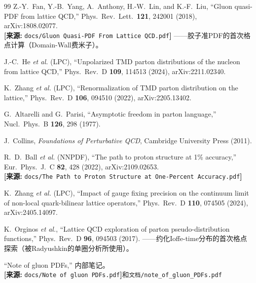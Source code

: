 \documentclass[12pt,a4paper]{ctexart}
\theoremstyle{definition}
\begin{document}
\begin{thebibliography}{99}
Z.-Y.~Fan, Y.-B.~Yang, A.~Anthony, H.-W.~Lin, and K.-F.~Liu,
``Gluon quasi-PDF from lattice QCD,''
Phys.\ Rev.\ Lett.\ \textbf{121}, 242001 (2018), arXiv:1808.02077.
\\\textbf{[来源:} \texttt{docs/Gluon Quasi-PDF From Lattice QCD.pdf}\textbf{]}
——胶子准PDF的首次格点计算（Domain-Wall费米子）。

J.-C.~He \textit{et al.} (LPC), ``Unpolarized TMD parton distributions of the nucleon from lattice QCD,''
Phys.\ Rev.\ D \textbf{109}, 114513 (2024), arXiv:2211.02340.

K.~Zhang \textit{et al.} (LPC), ``Renormalization of TMD parton distribution on the lattice,''
Phys.\ Rev.\ D \textbf{106}, 094510 (2022), arXiv:2205.13402.

G.~Altarelli and G.~Parisi, ``Asymptotic freedom in parton language,''
Nucl.\ Phys.\ B \textbf{126}, 298 (1977).

J.~Collins, \textit{Foundations of Perturbative QCD}, Cambridge University Press (2011).

R.~D.~Ball \textit{et al.} (NNPDF), ``The path to proton structure at 1\% accuracy,''
Eur.\ Phys.\ J.\ C \textbf{82}, 428 (2022), arXiv:2109.02653.
\\\textbf{[来源:} \texttt{docs/The Path to Proton Structure at One-Percent Accuracy.pdf}\textbf{]}

K.~Zhang \textit{et al.} (LPC), ``Impact of gauge fixing precision on the continuum limit of non-local quark-bilinear lattice operators,''
Phys.\ Rev.\ D \textbf{110}, 074505 (2024), arXiv:2405.14097.

K.~Orginos \textit{et al.}, ``Lattice QCD exploration of parton pseudo-distribution functions,''
Phys.\ Rev.\ D \textbf{96}, 094503 (2017).
——约化Ioffe-time分布的首次格点探索（被Radyushkin的单圈分析所使用）。

``Note of gluon PDFs,'' 内部笔记。
\\\textbf{[来源:} \texttt{docs/Note of gluon PDFs.pdf}\textbf{]}和\texttt{文档/note\_of\_gluon\_PDFs.pdf}

\end{thebibliography}
\end{document}

